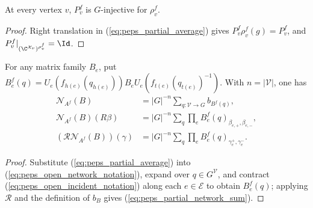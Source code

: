 \begin{lemma}%
    \label{thm:peps_partial_averaging_injective}
    \leanok
    At every vertex $v$, $P_v^f$ is $G$-injective for $\rho_v^f$.
\end{lemma}
\begin{proof}\leanok
    Right translation in (\ref{eq:peps_partial_average}) gives
    $P_v^f\rho_v^f(g)=P_v^f$, and $P_v^f|_{(\C^{\mathcal X_v})^{\rho_v^f}}=\Id$.
\end{proof}

\begin{lemma}%
    \label{thm:peps_partial_network_expansion}
    \leanok
    For any matrix family $B_e$, put
    $B_e^f(q)=U_e(f_{h(e)}(q_{h(e)}))B_e
        U_e(f_{t(e)}(q_{t(e)})^{-1})$.
    With $n=|\mathcal V|$, one has
    \begin{align}
        \mathcal N_{A^f}(B)
         & =|G|^{-n}\sum_{q:\mathcal V\to G}b_{B^f(q)},
        \label{eq:peps_partial_network_sum}                         \\
        \mathcal N_{A^f}(B)(R\beta)
         & =|G|^{-n}\sum_q\prod_e
        B_e^f(q)_{\beta_{e,+},\beta_{e,-}},
        \nonumber                                                   \\
        (\mathcal R\mathcal N_{A^f}(B))(\gamma)
         & =|G|^{-n}\sum_q\prod_e B_e^f(q)_{\gamma_e^+,\gamma_e^-}.
        \nonumber
    \end{align}
\end{lemma}
\begin{proof}\leanok
    Substitute (\ref{eq:peps_partial_average}) into
    (\ref{eq:peps_open_network_notation}), expand over
    $q\in G^{\mathcal V}$, and contract (\ref{eq:peps_open_incident_notation})
    along each $e\in\mathcal E$ to obtain $B_e^f(q)$; applying $\mathcal R$ and
    the definition of $b_B$ gives (\ref{eq:peps_partial_network_sum}).
\end{proof}

